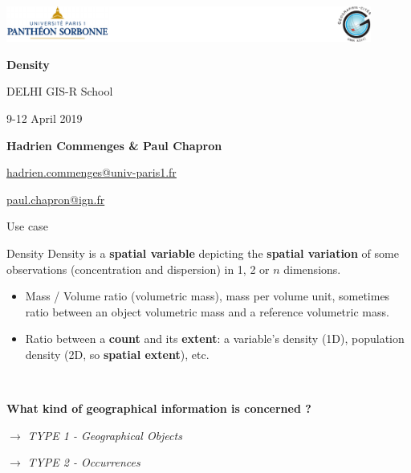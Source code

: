 \graphicspath{{IMAGE/}}

\begin{frame}

\includegraphics[width=12cm]{Logos.pdf}

\vfill

\begin{center}

\vspace*{1.5cm}

\LARGE
\textbf{Density}

\vspace*{1.5cm}
 DELHI GIS-R School


\large
9-12 April 2019

\vspace*{1.5cm}


\textbf{Hadrien Commenges \& Paul Chapron}

{\small

\vspace*{0.1cm}

\url{hadrien.commenges@univ-paris1.fr}

\url{paul.chapron@ign.fr}
}

\end{center}

\end{frame}

\begin{frame}{Use case}

\begin{block}{Density}
Density is a \textbf{spatial variable} depicting the \textbf{spatial variation} of some observations (concentration and dispersion) in 1, 2 or $n$ dimensions. 
\end{block}

\begin{itemize}
\item Mass / Volume ratio (volumetric mass), mass per volume unit, sometimes ratio between an object volumetric mass and a reference volumetric mass. 
\item Ratio between a \textbf{count}  and its \textbf{extent}: a variable's density (1D), population density (2D, so \textbf{spatial extent}), etc.
\end{itemize}

~

\textbf{What kind of geographical information is concerned ?}

$\rightarrow$ \textit{TYPE 1 - Geographical Objects}

$\rightarrow$ \textit{TYPE 2 - Occurrences}

\end{frame}


